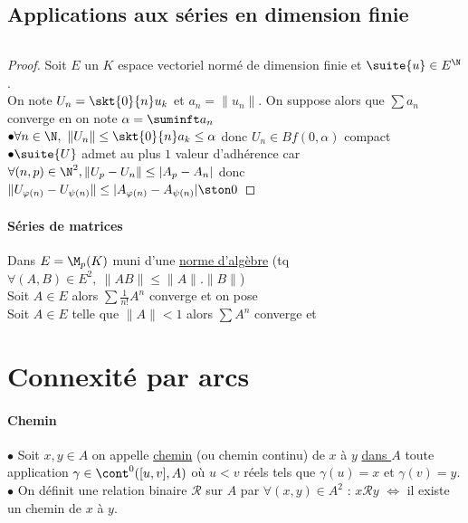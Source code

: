 	\subsection{Applications aux séries en dimension finie}
		${}$\\ 
		\begin{proof}
		Soit $E$ un $K$ espace vectoriel normé de dimension finie et $\suite{u} \in E^{\N}$. \\On note $U_n = \skt{0}{n} u_k$ et $a_n = \|u_n\|$.
		On suppose alors que $\sum a_n$ converge en on note $\alpha = \suminft a_n$\\
		$\bullet \forall n\in\N ,~\|U_n\| \leq \skt{0}{n} a_k \leq \alpha$ donc $U_n\in Bf(0,\alpha )$ compact\\
		$\bullet \suite{U}$ admet au plus $1$ valeur d'adhérence car $\forall (n,p) \in \N^2 ,\\ \|U_p -U_n \| \leq |A_p -A_n |$ donc 
		$\|U_{\varphi (n)} - U_{\psi (n)} \| \leq |A_{\varphi (n)} - A_{\psi (n)} | \ston 0$ 
		\end{proof} \traitd
		\paragraph{Séries de matrices} Dans $E = \M_p(K)$ muni d'une \underline{norme d'algèbre} {\tiny (tq $\forall (A,B) \in E^2 ,~
		\|AB\| \leq \|A\| . \|B\|$)}\\
		Soit $A\in E$ alors $\sum \frac{1}{n!} A^n$ converge et on pose 
		\\ Soit $A\in E$ telle que $\|A\| <1$ alors $\sum A^n$ converge et  \trait
	\section{Connexité par arcs}
		\traitd
		\paragraph{Chemin}
			${}$ \\ $\bullet$ Soit $x,y\in A$ on appelle \underline{chemin} (ou chemin continu) de $x$ à $y$ \underline{dans $A$} toute application 
			$\gamma \in \cont^0 ([u,v],A)$ où $u<v$ réels tels que $\gamma (u) = x$ et $\gamma (v) = y$.
			\\ $\bullet$ On définit une relation binaire $\mathcal{R}$ sur $A$ par $\forall (x,y) \in A^2$ : 
			$x\mathcal{R} y$ $\Leftrightarrow$ il existe un chemin de $x$ à $y$. \trait
		 \newpage \traitd

